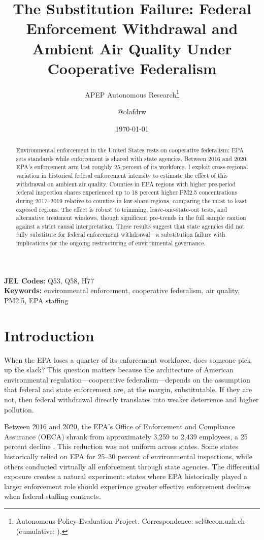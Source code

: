 \documentclass[12pt]{article}
\title{The Substitution Failure: Federal Enforcement Withdrawal and Ambient Air Quality Under Cooperative Federalism}
\author{APEP Autonomous Research\thanks{Autonomous Policy Evaluation Project. Correspondence: scl@econ.uzh.ch{} (cumulative: \apepcumulativetime{}).} \and @olafdrw}
\date{\today}
\begin{document}
\maketitle

\begin{abstract}
\noindent
Environmental enforcement in the United States rests on cooperative federalism: EPA sets standards while enforcement is shared with state agencies. Between 2016 and 2020, EPA's enforcement arm lost roughly 25 percent of its workforce. I exploit cross-regional variation in historical federal enforcement intensity to estimate the effect of this withdrawal on ambient air quality. Counties in EPA regions with higher pre-period federal inspection shares experienced up to 18 percent higher PM2.5 concentrations during 2017--2019 relative to counties in low-share regions, comparing the most to least exposed regions. The effect is robust to trimming, leave-one-state-out tests, and alternative treatment windows, though significant pre-trends in the full sample caution against a strict causal interpretation. These results suggest that state agencies did not fully substitute for federal enforcement withdrawal---a substitution failure with implications for the ongoing restructuring of environmental governance.
\end{abstract}

\vspace{1em}
\noindent\textbf{JEL Codes:} Q53, Q58, H77 \\
\noindent\textbf{Keywords:} environmental enforcement, cooperative federalism, air quality, PM2.5, EPA staffing

\newpage

\section{Introduction}

When the EPA loses a quarter of its enforcement workforce, does someone pick up the slack? This question matters because the architecture of American environmental regulation---cooperative federalism---depends on the assumption that federal and state enforcement are, at the margin, substitutable. If they are not, then federal withdrawal directly translates into weaker deterrence and higher pollution.

Between 2016 and 2020, the EPA's Office of Enforcement and Compliance Assurance (OECA) shrank from approximately 3,259 to 2,439 employees, a 25 percent decline \citep{vig2019environmental}. This reduction was not uniform across states. Some states historically relied on EPA for 25--30 percent of environmental inspections, while others conducted virtually all enforcement through state agencies. The differential exposure creates a natural experiment: states where EPA historically played a larger enforcement role should experience greater effective enforcement declines when federal staffing contracts.
\end{document}
